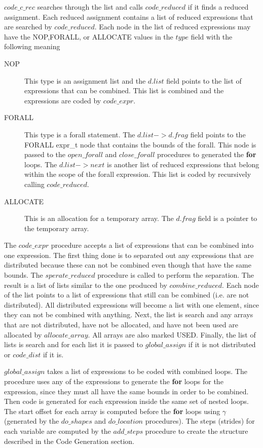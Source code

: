 $code\_c\_rec$ searches through the list and calls
$code\_reduced$ if it finds a reduced assignment.  Each reduced assignment
contains a list of reduced expressions that are searched by $code\_reduced$.
Each node in the list of reduced expressions may have the NOP,FORALL,
 or ALLOCATE values in the $type$ field with the following meaning
\begin{description}
\item[NOP] This type is an assignment list and the $d.list$ field points
to the list of expressions that can be combined.  This list is combined
and the expressions are coded by $code\_expr$.
\item[FORALL] This type is a forall statement.  The $d.list->d.frag$
field points to the FORALL expr\_t node that contains the bounds of the
forall.  This node is passed to the $open\_forall$ and $close\_forall$ 
procedures to generated the {\bf for} loops.  The $d.list->next$ is another
list of reduced expressions that belong within the scope of the forall
expression.  This list is coded by recursively calling $code\_reduced$.
\item[ALLOCATE]  This is an allocation for a temporary array.  The
$d.frag$ field is a pointer to the temporary array.
\end{description}

The $code\_expr$ procedure accepts a list of expressions that can be
combined into one expression.  The first thing done is to separated out
any expressions that are distributed because these can not be combined
even though that have the same bounds.  The $sperate\_reduced$ procedure
is called to perform the separation.  The result is a list of lists
similar to the one produced by $combine\_reduced$.  Each node of the list
points to a list of expressions that still can be combined (i.e. are not
distributed).  All distributed expressions will become a list with one element,
since they can not be combined with anything.  Next, the list is search and
any arrays that are not distributed, have not be allocated, and have not been
used are allocated by $allocate\_array$.  All arrays are also marked USED.
Finally, the list of lists is search and for each list it is passed to
$global\_assign$ if it is not distributed or $code\_dist$ if it is.

$global\_assign$ takes a list of expressions to be coded with combined loops.
The procedure uses any of the expressions to generate the {\bf for} loops for 
the 
expression, since they must all have the same bounds in order to be combined.
Then code is generated for each expression inside the same set of nested 
loops.  The start offset for each array is computed before the {\bf for}
loops using $\gamma$ (generated by the $do\_shapes$ and $do\_location$ 
procedures).
The steps (strides) for each variable are computed by the $add\_steps$ 
procedure to create the structure described in the Code Generation
section.

